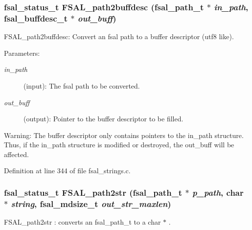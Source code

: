 \subsubsection[{FSAL\_\-path2buffdesc}]{\setlength{\rightskip}{0pt plus 5cm}fsal\_\-status\_\-t FSAL\_\-path2buffdesc (fsal\_\-path\_\-t $\ast$ {\em in\_\-path}, \/  fsal\_\-buffdesc\_\-t $\ast$ {\em out\_\-buff})}\label{group__FSALNameFunctions_g7b4c85ab478349bc2c080f688d35e922}


FSAL\_\-path2buffdesc: Convert an fsal path to a buffer descriptor (utf8 like).

\begin{Desc}
\item[Parameters:]
\begin{description}
\item[{\em in\_\-path}](input): The fsal path to be converted. \item[{\em out\_\-buff}](output): Pointer to the buffer descriptor to be filled.\end{description}
\end{Desc}
\begin{Desc}
\item[Warning:]The buffer descriptor only contains pointers to the in\_\-path structure. Thus, if the in\_\-path structure is modified or destroyed, the out\_\-buff will be affected. \end{Desc}


Definition at line 344 of file fsal\_\-strings.c.
\subsubsection[{FSAL\_\-path2str}]{\setlength{\rightskip}{0pt plus 5cm}fsal\_\-status\_\-t FSAL\_\-path2str (fsal\_\-path\_\-t $\ast$ {\em p\_\-path}, \/  char $\ast$ {\em string}, \/  fsal\_\-mdsize\_\-t {\em out\_\-str\_\-maxlen})}\label{group__FSALNameFunctions_g9763f85fa3ad46d20e37c4f5b8654b44}


FSAL\_\-path2str : converts an fsal\_\-path\_\-t to a char $\ast$ .

